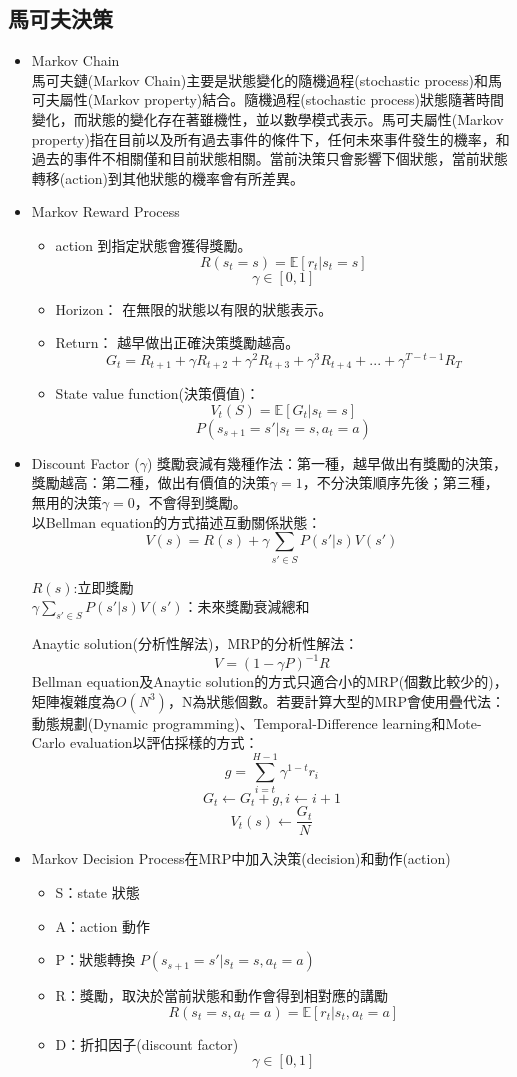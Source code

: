 \subsection{馬可夫決策}
\begin{itemize}
\item Markov Chain\\
 馬可夫鏈(Markov Chain)主要是狀態變化的隨機過程(stochastic process)和馬可夫屬性(Markov property)結合。隨機過程(stochastic process)狀態隨著時間變化，而狀態的變化存在著雖機性，並以數學模式表示。馬可夫屬性(Markov property)指在目前以及所有過去事件的條件下，任何未來事件發生的機率，和過去的事件不相關僅和目前狀態相關。當前決策只會影響下個狀態，當前狀態轉移(action)到其他狀態的機率會有所差異。\\
\item Markov Reward Process\\
\begin{itemize}
\item action 到指定狀態會獲得獎勵。
$$R(s_t=s) = \mathbb{E}[r_t|s_t = s]$$
$$\gamma \in [0, 1]$$
\item Horizon：
在無限的狀態以有限的狀態表示。
\item Return：
越早做出正確決策獎勵越高。
$$G_t = R_{t+1}+\gamma R_{t+2}+\gamma^2 R_{t+3}+\gamma^3 R_{t+4}+...+\gamma^{T-t-1} R_{T}$$
\item State value function(決策價值)：
$$V_t(S) = \mathbb{E}[G_t|s_t = s]$$
$$P(s_{s+1}=s'|s_t=s,a_t=a)$$
\end{itemize}
\item Discount Factor ($\gamma$)
獎勵衰減有幾種作法：第一種，越早做出有獎勵的決策，獎勵越高：第二種，做出有價值的決策$\gamma = 1$，不分決策順序先後；第三種，無用的決策$\gamma = 0$，不會得到獎勵。\\
以Bellman equation的方式描述互動關係狀態：\\
$$V(s) = R(s)+\gamma\sum_{s'\in S}P(s'|s)V(s')$$
\begin{center}
$R(s)$:立即獎勵\\
$\gamma\sum_{s'\in S}P(s'|s)V(s')$：未來獎勵衰減總和
\end{center}
Anaytic solution(分析性解法)，MRP的分析性解法：
$$V = (1-\gamma P)^{-1}R$$
Bellman equation及Anaytic solution的方式只適合小的MRP(個數比較少的)，矩陣複雜度為$O(N^3)$，N為狀態個數。若要計算大型的MRP會使用疊代法：動態規劃(Dynamic programming)、Temporal-Difference learning和Mote-Carlo evaluation以評估採樣的方式：
$$g = \sum_{i=t}^{H-1}\gamma^{1-t}r_i$$
$$G_t \leftarrow G_t+g,  i \leftarrow i+1$$
$$V_t(s) \leftarrow \frac{G_t}{N}$$
\item Markov Decision Process在MRP中加入決策(decision)和動作(action)
\begin{itemize}
\item S：state 狀態
\item A：action 動作
\item P：狀態轉換
$P(s_{s+1}=s'|s_t=s,a_t=a)$
\item R：獎勵，取決於當前狀態和動作會得到相對應的講勵
$$R(s_t=s, a_t=a) = \mathbb{E}[r_t|s_t, a_t=a]$$
\item D：折扣因子(discount factor)
$$\gamma \in [0,1]$$
\end{itemize}
\end{itemize}

